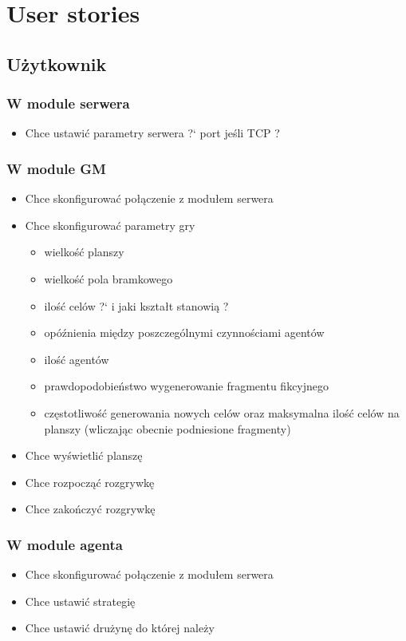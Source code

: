 \documentclass[Dokumentacja.tex]{subfiles}
\begin{document}
\section{User stories}
\subsection{Użytkownik}
\subsubsection{W module serwera}
\begin{itemize}
    \item Chce ustawić parametry serwera ?` port jeśli TCP ?
\end{itemize}

\subsubsection{W module GM}
\begin{itemize}
    \item Chce skonfigurować połączenie z modułem serwera
    \item Chce skonfigurować parametry gry
    \begin{itemize}
        \item wielkość planszy
        \item wielkość pola bramkowego
        \item ilość celów ?` i jaki kształt stanowią ?
        \item opóźnienia między poszczególnymi czynnościami agentów
        \item ilość agentów
        \item prawdopodobieństwo wygenerowanie fragmentu fikcyjnego
        \item częstotliwość generowania nowych celów oraz maksymalna ilość celów na planszy (wliczając obecnie podniesione fragmenty)
    \end{itemize}
    \item Chce wyświetlić planszę
    \item Chce rozpocząć rozgrywkę
    \item Chce zakończyć rozgrywkę
\end{itemize}


\subsubsection{W module agenta}
\begin{itemize}
    \item Chce skonfigurować połączenie z modułem serwera
    \item Chce ustawić strategię
    \item Chce ustawić drużynę do której należy
\end{itemize}
\end{document}
